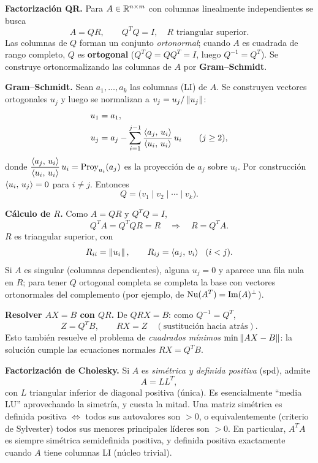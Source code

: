 \begin{teoria}
\textbf{Factorización QR.} Para $A \in \mathbb{R}^{n \times m}$ con columnas linealmente independientes se busca
\[
A = QR, \qquad Q^T Q = I,\quad R \text{ triangular superior}.
\]
Las columnas de $Q$ forman un conjunto \emph{ortonormal}; cuando $A$ es cuadrada de rango completo, $Q$ es \textbf{ortogonal} ($Q^T Q = Q Q^T = I$, luego $Q^{-1} = Q^T$). Se construye ortonormalizando las columnas de $A$ por \textbf{Gram--Schmidt}.

\textbf{Gram--Schmidt.} Sean $a_1, \dots, a_k$ las columnas (LI) de $A$. Se construyen vectores ortogonales $u_j$ y luego se normalizan a $v_j = u_j / \left\lVert u_j \right\rVert$:
\begin{align*}
u_1 &= a_1, \\
u_j &= a_j - \sum_{i=1}^{j-1} \frac{\left\langle a_j,\, u_i \right\rangle}{\left\langle u_i,\, u_i \right\rangle}\, u_i \qquad (j \ge 2),
\end{align*}
donde $\dfrac{\left\langle a_j,\, u_i \right\rangle}{\left\langle u_i,\, u_i \right\rangle}\,u_i = \operatorname{Proy}_{u_i}(a_j)$ es la proyección de $a_j$ sobre $u_i$. Por construcción $\left\langle u_i,\, u_j \right\rangle = 0$ para $i \neq j$. Entonces
\[
Q = \bigl(v_1 \mid v_2 \mid \cdots \mid v_k\bigr).
\]

\textbf{Cálculo de $R$.} Como $A = QR$ y $Q^T Q = I$,
\[
Q^T A = Q^T Q R = R \quad\Longrightarrow\quad R = Q^T A.
\]
$R$ es triangular superior, con
\[
R_{ii} = \left\lVert u_i \right\rVert, \qquad R_{ij} = \left\langle a_j,\, v_i \right\rangle\ \ (i < j).
\]
Si $A$ es singular (columnas dependientes), alguna $u_j = 0$ y aparece una fila nula en $R$; para tener $Q$ ortogonal completa se completa la base con vectores ortonormales del complemento (por ejemplo, de $\operatorname{Nu}(A^T) = \operatorname{Im}(A)^\perp$).

\textbf{Resolver $AX = B$ con $QR$.} De $QRX = B$: como $Q^{-1} = Q^T$,
\[
Z = Q^T B, \qquad RX = Z \quad(\text{sustitución hacia atrás}).
\]
Esto también resuelve el problema de \emph{cuadrados mínimos} $\min \left\lVert AX - B \right\rVert$: la solución cumple las ecuaciones normales $R X = Q^T B$.

\textbf{Factorización de Cholesky.} Si $A$ es \emph{simétrica y definida positiva} (spd), admite
\[
A = L L^T,
\]
con $L$ triangular inferior de diagonal positiva (única). Es esencialmente ``media LU'' aprovechando la simetría, y cuesta la mitad. Una matriz simétrica es definida positiva $\iff$ todos sus autovalores son $> 0$, o equivalentemente (criterio de Sylvester) todos sus menores principales líderes son $> 0$. En particular, $A^T A$ es siempre simétrica semidefinida positiva, y definida positiva exactamente cuando $A$ tiene columnas LI (núcleo trivial).
\end{teoria}


